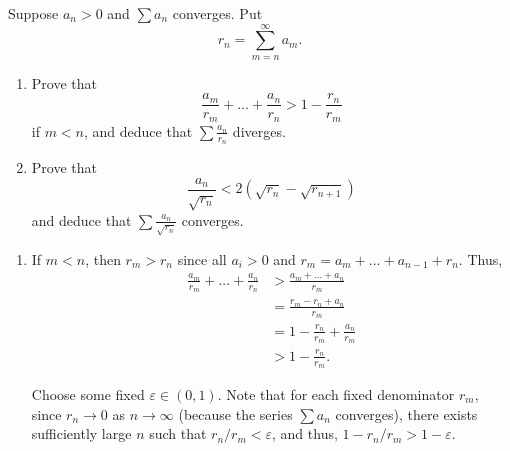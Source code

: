 \documentclass[12 pt, letterpaper]{hmcpset}
\begin{document}
\begin{problem}
	Suppose $a_{n} > 0$ and $\sum a_{n}$ converges. Put
	\[
		r_{n} = \sum_{m = n}^{\infty} a_{m}.
	\]
	\begin{enumerate}
		\item Prove that
			\[
				\frac{a_{m}}{r_{m}} + \dots + \frac{a_{n}}{r_{n}} > 1 - \frac{r_{n}}{r_{m}}
			\]
			if $m < n$, and deduce that $\sum \frac{a_{n}}{r_{n}}$ diverges.
		\item Prove that
			\[
				\frac{a_{n}}{\sqrt{r_{n}}} < 2(\sqrt{r_{n}} - \sqrt{r_{n + 1}})
			\]
			and deduce that $\sum \frac{a_{n}}{\sqrt{r_{n}}}$ converges.
	\end{enumerate}
\end{problem}

\begin{solution}
	\begin{enumerate}
		\item If $m < n$, then $r_{m} > r_{n}$ since all $a_{i} > 0$ and $r_{m} = a_{m} + \dots + a_{n - 1} + r_{n}$. Thus, 
			\[
				\begin{split}
					\frac{a_{m}}{r_{m}} + \dots + \frac{a_{n}}{r_{n}} & > \frac{a_{m} + \dots + a_{n}}{r_{m}} \\
											  & = \frac{r_{m} - r_{n} + a_{n}}{r_{m}} \\
											  & = 1 - \frac{r_{n}}{r_{m}} + \frac{a_{n}}{r_{m}} \\
											  & > 1 - \frac{r_{n}}{r_{m}}.
				\end{split}
			\]
			
			Choose some fixed $\varepsilon \in (0, 1)$. Note that for each fixed denominator $r_{m}$, since $r_{n} \to 0$ as $n \to \infty$ (because the series $\sum a_{n}$ converges), there exists sufficiently large $n$ such that $r_{n}/r_{m} < \varepsilon$, and thus,  $1 - r_{n} / r_{m} > 1 - \varepsilon$.


\end{enumerate}
\end{solution}
\end{document}
